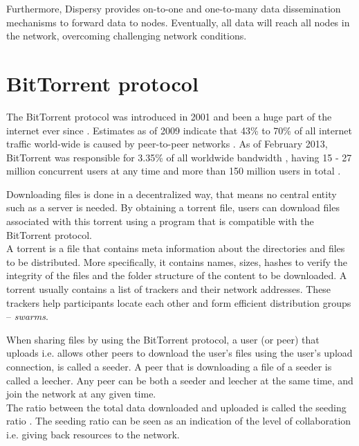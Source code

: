 Furthermore, Dispersy provides on-to-one and one-to-many data dissemination mechanisms to forward data to nodes.
Eventually, all data will reach all nodes in the network, overcoming challenging network conditions.

\section{BitTorrent protocol}
The BitTorrent protocol was introduced in 2001 and been a huge part of the internet ever since \cite{Cohen2001BitTorrent}.
Estimates as of 2009 indicate that 43\% to 70\% of all internet traffic world-wide is caused by peer-to-peer networks \cite{schulze2009internet}.
As of February 2013, BitTorrent was responsible for 3.35\% of all worldwide bandwidth \cite{palo2013application}, having 15 - 27 million concurrent users at any time \cite{wang2013measuring} and more than 150 million users in total \cite{reuters2012bittorrent}.

Downloading files is done in a decentralized way, that means no central entity such as a server is needed.
By obtaining a torrent file, users can download files associated with this torrent using a program that is compatible with the BitTorrent protocol.\\

A torrent is a file that contains meta information about the directories and files to be distributed.
More specifically, it contains names, sizes, hashes to verify the integrity of the files and the folder structure of the content to be downloaded.
A torrent usually contains a list of trackers and their network addresses.
These trackers help participants locate each other and form efficient distribution groups -- \emph{swarms}.
 

When sharing files by using the BitTorrent protocol, a user (or peer) that uploads i.e. allows other peers to download the user's files using the user's upload connection, is called a seeder.
A peer that is downloading a file of a seeder is called a leecher.
Any peer can be both a seeder and leecher at the same time, and join the network at any given time.\\

The ratio between the total data downloaded and uploaded is called the seeding ratio \cite{Cohen-bittorrent}.
The seeding ratio can be seen as an indication of the level of collaboration i.e. giving back resources to the network.\\


